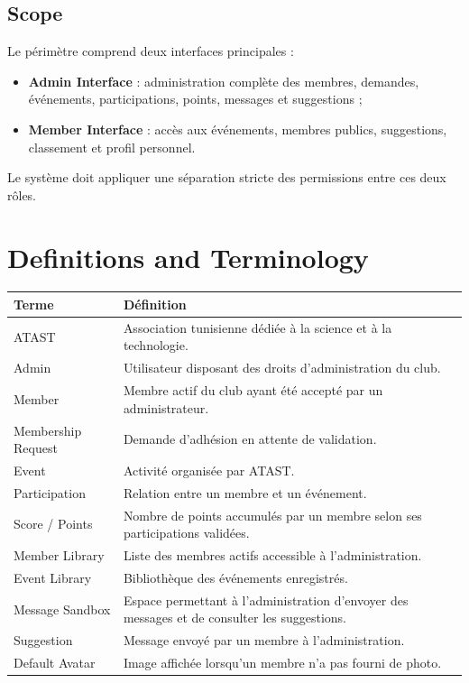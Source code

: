 \documentclass[11pt,a4paper]{report}
\begin{document}
\section{Scope}

Le périmètre comprend deux interfaces principales :

\begin{itemize}
    \item \textbf{Admin Interface} : administration complète des membres, demandes, événements, participations, points, messages et suggestions ;
    \item \textbf{Member Interface} : accès aux événements, membres publics, suggestions, classement et profil personnel.
\end{itemize}

Le système doit appliquer une séparation stricte des permissions entre ces deux rôles.

\chapter{Definitions and Terminology}

\begin{longtable}{p{}p{}}
\toprule
\textbf{Terme} & \textbf{Définition}\\
\midrule
ATAST & Association tunisienne dédiée à la science et à la technologie.\\
Admin & Utilisateur disposant des droits d'administration du club.\\
Member & Membre actif du club ayant été accepté par un administrateur.\\
Membership Request & Demande d'adhésion en attente de validation.\\
Event & Activité organisée par ATAST.\\
Participation & Relation entre un membre et un événement.\\
Score / Points & Nombre de points accumulés par un membre selon ses participations validées.\\
Member Library & Liste des membres actifs accessible à l'administration.\\
Event Library & Bibliothèque des événements enregistrés.\\
Message Sandbox & Espace permettant à l'administration d'envoyer des messages et de consulter les suggestions.\\
Suggestion & Message envoyé par un membre à l'administration.\\
Default Avatar & Image affichée lorsqu'un membre n'a pas fourni de photo.\\
\bottomrule
\end{longtable}
\end{document}

